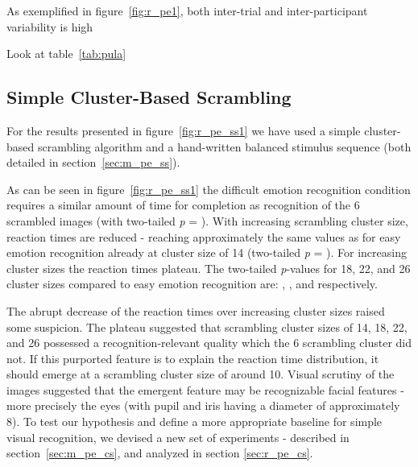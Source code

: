 	As exemplified in figure~\ref{fig:r_pe1}, both inter-trial and inter-participant variability is high
	
	Look at table~\ref{tab:pula}
	
	\subsection{Simple Cluster-Based Scrambling}\label{sec:r_pe_ss}
	    For the results presented in figure~\ref{fig:r_pe_ss1} we have used a simple cluster-based scrambling algorithm and a hand-written balanced stimulus sequence 
	    (both detailed in section~\ref{sec:m_pe_ss}).
	    
	    As can be seen in figure~\ref{fig:r_pe_ss1} the difficult emotion recognition condition requires a similar amount of time for completion as recognition of the \SI{6}{\pixel} scrambled images 
	    (with two-tailed \textit{p} = ).
	    With increasing scrambling cluster size, reaction times are reduced - reaching approximately the same values as for easy emotion recognition already at cluster size of \SI{14}{\pixel}
	    (two-tailed \textit{p} = ).
	    For increasing cluster sizes the reaction times plateau. 
	    The two-tailed \textit{p}-values for \SI{18}{\pixel}, \SI{22}{\pixel}, and \SI{26}{\pixel} cluster sizes compared to easy emotion recognition are:
	    , , and  respectively.
	    
	    The abrupt decrease of the reaction times over increasing cluster sizes raised some suspicion.
	    The plateau suggested that scrambling cluster sizes of \SI{14}{\pixel}, \SI{18}{\pixel}, \SI{22}{\pixel}, and \SI{26}{\pixel} possessed a recognition-relevant quality which the \SI{6}{\pixel} scrambling cluster did not.
	    If this purported feature is to explain the reaction time distribution, it should emerge at a scrambling cluster size of around \SI{10}{\pixel}.
	    Visual scrutiny of the images suggested that the emergent feature may be recognizable facial features - more precisely the eyes (with pupil and iris having a diameter of approximately \SI{8}{\pixel}).
	    To test our hypothesis and define a more appropriate baseline for simple visual recognition, we devised a new set of experiments - described in section~\ref{sec:m_pe_cs}, and analyzed in section \ref{sec:r_pe_cs}.
	    
